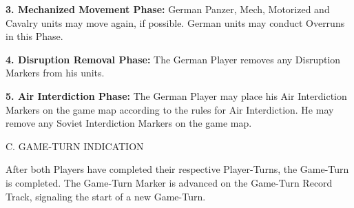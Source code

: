 \textbf{3. Mechanized Movement Phase:} German Panzer, Mech, Motorized and Cavalry units may move again, if possible. German units may conduct Overruns in this Phase.

\textbf{4. Disruption Removal Phase:} The German Player removes any Disruption Markers from his units.

\textbf{5. Air Interdiction Phase:} The German Player may place his Air Interdiction Markers on the game map according to the rules for Air Interdiction. He may remove any Soviet Interdiction Markers on the game map.

C. GAME-TURN INDICATION

After both Players have completed their respective Player-Turns, the Game-Turn is completed. The Game-Turn Marker is advanced on the Game-Turn Record Track, signaling the start of a new Game-Turn.
